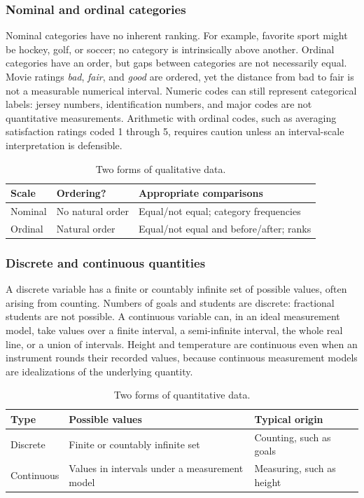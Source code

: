 \documentclass[11pt]{article}
\begin{document}
\subsubsection{Nominal and ordinal categories}
Nominal categories have no inherent ranking.  For example, favorite sport
might be hockey, golf, or soccer; no category is intrinsically above another.
Ordinal categories have an order, but gaps between categories are not
necessarily equal.  Movie ratings \emph{bad}, \emph{fair}, and \emph{good}
are ordered, yet the distance from bad to fair is not a measurable numerical
interval.  Numeric codes can still represent categorical labels: jersey
numbers, identification numbers, and major codes are not quantitative
measurements.  Arithmetic with ordinal codes, such as averaging satisfaction
ratings coded 1 through 5, requires caution unless an interval-scale
interpretation is defensible.

\begin{table}[ht]
\centering
\caption{Two forms of qualitative data.}
\begin{tabularx}{\textwidth}{@{}lYY@{}}
\toprule
Scale & Ordering? & Appropriate comparisons \\
\midrule
Nominal & No natural order & Equal/not equal; category frequencies \\
Ordinal & Natural order & Equal/not equal and before/after; ranks \\
\bottomrule
\end{tabularx}
\end{table}

\subsubsection{Discrete and continuous quantities}
A discrete variable has a finite or countably infinite set of possible
values, often arising from counting.  Numbers of goals and students are
discrete: fractional students are not possible.  A continuous variable can,
in an ideal measurement model, take values over a finite interval, a
semi-infinite interval, the whole real line, or a union of intervals.  Height
and temperature are continuous even when an instrument rounds their recorded
values, because continuous measurement models are idealizations of the
underlying quantity.

\begin{table}[ht]
\centering
\caption{Two forms of quantitative data.}
\begin{tabularx}{\textwidth}{@{}lYY@{}}
\toprule
Type & Possible values & Typical origin \\
\midrule
Discrete & Finite or countably infinite set & Counting, such as goals \\
Continuous & Values in intervals under a measurement model & Measuring, such as height \\
\bottomrule
\end{tabularx}
\end{table}
\end{document}

